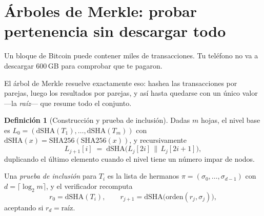 \documentclass[11pt,a4paper]{article}
\theoremstyle{definition}
\newtheorem{definicion}{Definición}
\theoremstyle{plain}
\theoremstyle{remark}
\newcommand{\dsha}{\mathrm{dSHA}}
\newcommand{\concat}{\,\|\,}
\begin{document}
\section{Árboles de Merkle: probar pertenencia sin descargar todo}

Un bloque de Bitcoin puede contener miles de transacciones. Tu teléfono no va a
descargar 600\,GB para comprobar que te pagaron.

El árbol de Merkle resuelve exactamente eso: hashea las transacciones por
parejas, luego los resultados por parejas, y así hasta quedarse con un único
valor ---la \emph{raíz}--- que resume todo el conjunto.

\begin{definicion}[Construcción y prueba de inclusión]
Dadas $m$ hojas, el nivel base es
$L_0 = (\dsha(T_1),\dots,\dsha(T_m))$ con
$\dsha(x) = \mathrm{SHA256}(\mathrm{SHA256}(x))$, y recursivamente
\[
  L_{j+1}[i] \;=\; \dsha\bigl(L_j[2i] \concat L_j[2i+1]\bigr),
\]
duplicando el último elemento cuando el nivel tiene un número impar de nodos.

Una \emph{prueba de inclusión} para $T_i$ es la lista de hermanos
$\pi = (\sigma_0,\dots,\sigma_{d-1})$ con $d = \lceil \log_2 m \rceil$, y el
verificador recomputa
\[
  r_0 = \dsha(T_i), \qquad
  r_{j+1} = \dsha\bigl(\mathrm{orden}(r_j, \sigma_j)\bigr),
\]
aceptando si $r_d = \text{raíz}$.
\end{definicion}
\end{document}
